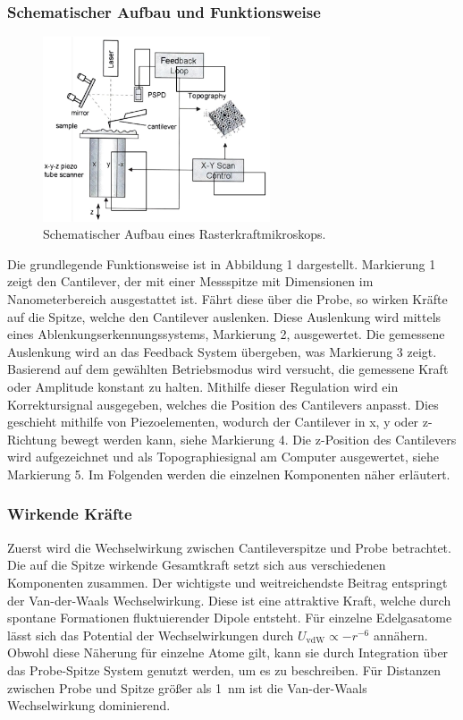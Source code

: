 \subsubsection{Schematischer Aufbau und Funktionsweise}
\begin{figure}
    \centering
    \includegraphics[width=0.6\textwidth]{../assets/messmethoden/afm/01_aufbau.png}
    \caption{Schematischer Aufbau eines Rasterkraftmikroskops. }
    \label{fig:afm_aufbau}
\end{figure}
Die grundlegende Funktionsweise ist in Abbildung 1 dargestellt.
Markierung 1 zeigt den Cantilever, der mit einer Messspitze mit Dimensionen im Nanometerbereich ausgestattet ist.
Fährt diese über die Probe, so wirken Kräfte auf die Spitze, welche den Cantilever auslenken.
Diese Auslenkung wird mittels eines Ablenkungserkennungssystems, Markierung 2, ausgewertet.
Die gemessene Auslenkung wird an das Feedback System übergeben, was Markierung 3 zeigt.
Basierend auf dem gewählten Betriebsmodus wird versucht, die gemessene Kraft oder Amplitude konstant zu halten.
Mithilfe dieser Regulation wird ein Korrektursignal ausgegeben, welches die Position des Cantilevers anpasst.
Dies geschieht mithilfe von Piezoelementen, wodurch der Cantilever in x, y oder z-Richtung bewegt werden kann, siehe Markierung 4.
Die z-Position des Cantilevers wird aufgezeichnet und als Topographiesignal am Computer ausgewertet, siehe Markierung 5.
Im Folgenden werden die einzelnen Komponenten näher erläutert.\autocite[8-10]{afm-buch}

\subsubsection{Wirkende Kräfte}
Zuerst wird die Wechselwirkung zwischen Cantileverspitze und Probe betrachtet.
Die auf die Spitze wirkende Gesamtkraft setzt sich aus verschiedenen Komponenten zusammen.
Der wichtigste und weitreichendste Beitrag entspringt der Van-der-Waals Wechselwirkung.
Diese ist eine attraktive Kraft, welche durch spontane Formationen fluktuierender Dipole entsteht.
Für einzelne Edelgasatome lässt sich das Potential der Wechselwirkungen durch
$U_{\mathrm{vdW}}\propto-r^{-6}$ annähern.
Obwohl diese Näherung für einzelne Atome gilt, kann sie durch Integration über das Probe-Spitze System genutzt
werden, um es zu beschreiben.
Für Distanzen zwischen Probe und Spitze größer als \qty{1}{\nano\meter} ist die Van-der-Waals Wechselwirkung
dominierend.

